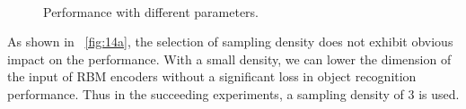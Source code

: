 \documentclass[5p]{elsarticle}
\begin{document}
\begin{figure}
\centering
  \\
\caption{Performance with different parameters.}
\label{fig:14}
\end{figure}

As shown in \figurename~\ref{fig:14a},
the selection of sampling density does not exhibit obvious impact on the performance.
With a small density, we can lower the dimension of the input of RBM encoders
without a significant loss in object recognition performance.
Thus in the succeeding experiments, a sampling density of $3$ is used. 
\end{document}
